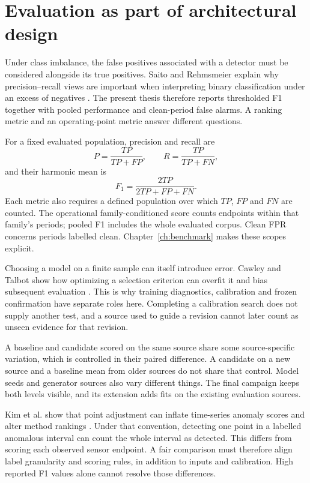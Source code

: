 \section{Evaluation as part of architectural design}
Under class imbalance, the false positives associated with a detector must be considered alongside its true positives. Saito and Rehmsmeier explain why precision--recall views are important when interpreting binary classification under an excess of negatives \cite{pr}. The present thesis therefore reports thresholded F1 together with pooled performance and clean-period false alarms. A ranking metric and an operating-point metric answer different questions.

For a fixed evaluated population, precision and recall are
\begin{equation}
 P=\frac{TP}{TP+FP},\qquad R=\frac{TP}{TP+FN},
\end{equation}
and their harmonic mean is
\begin{equation}
 F_1=\frac{2TP}{2TP+FP+FN}.
 \label{eq:f1}
\end{equation}
Each metric also requires a defined population over which $TP$, $FP$ and $FN$ are counted. The operational family-conditioned score counts endpoints within that family's periods; pooled F1 includes the whole evaluated corpus. Clean FPR concerns periods labelled clean. Chapter~\ref{ch:benchmark} makes these scopes explicit.

Choosing a model on a finite sample can itself introduce error. Cawley and Talbot show how optimizing a selection criterion can overfit it and bias subsequent evaluation \cite{selection}. This is why training diagnostics, calibration and frozen confirmation have separate roles here. Completing a calibration search does not supply another test, and a source used to guide a revision cannot later count as unseen evidence for that revision.

A baseline and candidate scored on the same source share some source-specific variation, which is controlled in their paired difference. A candidate on a new source and a baseline mean from older sources do not share that control. Model seeds and generator sources also vary different things. The final campaign keeps both levels visible, and its extension adds fits on the existing evaluation sources.

Kim et al. show that point adjustment can inflate time-series anomaly scores and alter method rankings \cite{kim2022evaluation}. Under that convention, detecting one point in a labelled anomalous interval can count the whole interval as detected. This differs from scoring each observed sensor endpoint. A fair comparison must therefore align label granularity and scoring rules, in addition to inputs and calibration. High reported F1 values alone cannot resolve those differences.


